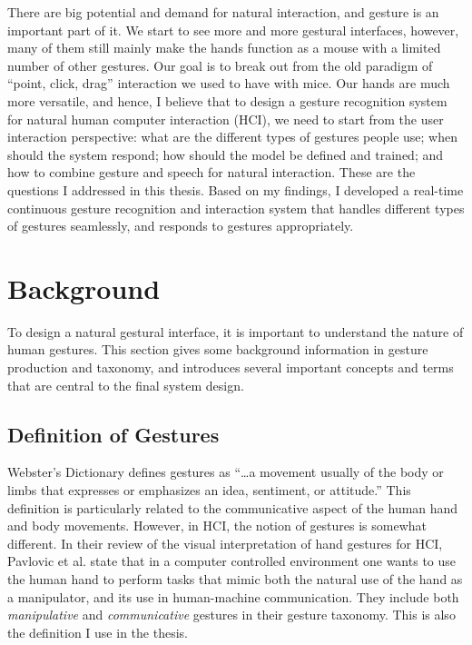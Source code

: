 There are big potential and demand for natural interaction, and gesture is
an important part of it. We start to see more and more gestural interfaces,
however, many of them still mainly make the hands function as a mouse with a
limited number of other gestures. Our goal is to break out from the old
paradigm of ``point, click, drag'' interaction we used to have with mice. 
Our hands are much more versatile, and hence, I believe that to design a gesture
recognition system for natural human computer interaction (HCI), we need to
start from the user interaction perspective: what are the different types of
gestures people use; when should the system respond; how should the model be
defined and trained; and how to combine gesture and speech for natural
interaction. These are the questions I addressed in this thesis. Based on my
findings, I developed a real-time continuous gesture recognition and
interaction system that handles different types of gestures seamlessly, and
responds to gestures appropriately.

\section{Background}
To design a natural gestural interface, it is important to understand the
nature of human gestures. This section gives some background information in
gesture production and taxonomy, and introduces several important concepts and
terms that are central to the final system design.
 
\subsection{Definition of Gestures}
Webster's Dictionary defines gestures as ``\ldots a movement usually of the body or limbs
that expresses or emphasizes an idea, sentiment, or attitude.'' This definition
is particularly related to the communicative aspect of the human hand and body
movements. However, in HCI, the notion
of gestures is somewhat different. In their review of the visual interpretation
of hand gestures for HCI, Pavlovic et al. \cite{Pavlovic97} state that in a computer
controlled environment one wants to use the human hand to perform tasks that
mimic both the natural use of the hand as a manipulator, and its use in
human-machine communication. They include both \textit{manipulative} and
\textit{communicative} gestures in their gesture taxonomy. This is also the
definition I use in the thesis.


